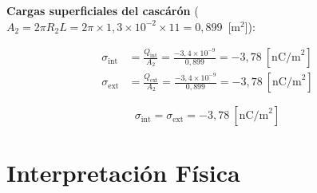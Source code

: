 \documentclass[12pt,letterpaper]{article}
\begin{document}
\noindent\textbf{Cargas superficiales del casc\'ar\'on}
($A_2 = 2\pi R_2 L = 2\pi\times1{,}3\times10^{-2}\times11 = 0{,}899$~[m$^2$]):

\begin{align*}
    \sigma_\text{int}
        &= \frac{Q_\text{int}}{A_2}
         = \frac{-3{,}4\times10^{-9}}{0{,}899}
         = -3{,}78\ [\text{nC/m}^2]\\[6pt]
    \sigma_\text{ext}
        &= \frac{Q_\text{ext}}{A_2}
         = \frac{-3{,}4\times10^{-9}}{0{,}899}
         = -3{,}78\ [\text{nC/m}^2]
\end{align*}

\[
    \boxed{\sigma_\text{int} = \sigma_\text{ext} = -3{,}78\ [\text{nC/m}^2]}
\]

\section*{Interpretaci\'on F\'isica}
\end{document}
